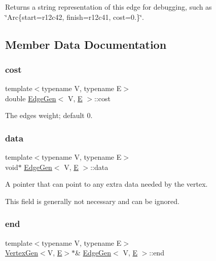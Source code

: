 Returns a string representation of this edge for debugging, such as \char`\"{}\+Arc\{start=r12c42, finish=r12c41, cost=0.\}\char`\"{}. 



\subsection{Member Data Documentation}
\mbox{\label{classEdgeGen_a3091a0127c4b13192de722c371142180}} 
\subsubsection{\texorpdfstring{cost}{cost}}
{\footnotesize\ttfamily template$<$typename V, typename E$>$ \\
double \mbox{\hyperlink{classEdgeGen}{Edge\+Gen}}$<$ V, \mbox{\hyperlink{gmath_8h_ab587ba72a9c23f238cb4fd70e2fdb545}{E}} $>$\+::cost}



The edge\textquotesingle{}s weight; default 0. 

\mbox{\label{classEdgeGen_abd0e9b9aaaa307600977b1a092bcb8e9}} 
\subsubsection{\texorpdfstring{data}{data}}
{\footnotesize\ttfamily template$<$typename V, typename E$>$ \\
void$\ast$ \mbox{\hyperlink{classEdgeGen}{Edge\+Gen}}$<$ V, \mbox{\hyperlink{gmath_8h_ab587ba72a9c23f238cb4fd70e2fdb545}{E}} $>$\+::data}



A pointer that can point to any extra data needed by the vertex. 

This field is generally not necessary and can be ignored. \mbox{\label{classEdgeGen_a338a2e11b46cc76b374b936584e4a76f}} 
\subsubsection{\texorpdfstring{end}{end}}
{\footnotesize\ttfamily template$<$typename V, typename E$>$ \\
\mbox{\hyperlink{classVertexGen}{Vertex\+Gen}}$<$V, \mbox{\hyperlink{gmath_8h_ab587ba72a9c23f238cb4fd70e2fdb545}{E}}$>$$\ast$\& \mbox{\hyperlink{classEdgeGen}{Edge\+Gen}}$<$ V, \mbox{\hyperlink{gmath_8h_ab587ba72a9c23f238cb4fd70e2fdb545}{E}} $>$\+::end}



